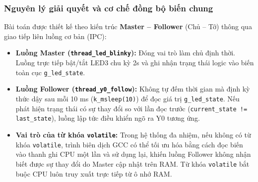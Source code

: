 \vspace{0.3cm}
\subsubsection{Nguyên lý giải quyết và cơ chế đồng bộ biến chung}
Bài toán được thiết kế theo kiến trúc \textbf{Master -- Follower} (Chủ -- Tớ) thông qua giao tiếp liên luồng cơ bản (IPC):
\begin{itemize}
    \item \textbf{Luồng Master (\texttt{thread\_led\_blinky}):} Đóng vai trò làm chủ định thời. Luồng trực tiếp bật/tắt LED3 chu kỳ 2s và ghi nhận trạng thái logic vào biến toàn cục \texttt{g\_led\_state}.
    \item \textbf{Luồng Follower (\texttt{thread\_y0\_follow}):} Không tự đếm thời gian mà định kỳ thức dậy sau mỗi 10 ms (\texttt{k\_msleep(10)}) để đọc giá trị \texttt{g\_led\_state}. Nếu phát hiện trạng thái có sự thay đổi so với lần đọc trước (\texttt{current\_state != last\_state}), luồng lập tức điều khiển ngõ ra Y0 tương ứng.
    \item \textbf{Vai trò của từ khóa \texttt{volatile}:} Trong hệ thống đa nhiệm, nếu không có từ khóa \texttt{volatile}, trình biên dịch GCC có thể tối ưu hóa bằng cách đọc biến vào thanh ghi CPU một lần và sử dụng lại, khiến luồng Follower không nhận biết được sự thay đổi do Master cập nhật trên RAM. Từ khóa \texttt{volatile} bắt buộc CPU luôn truy xuất trực tiếp từ ô nhớ RAM.
\end{itemize}

